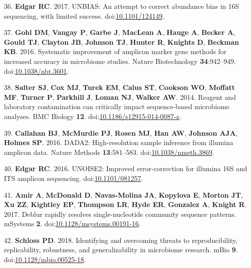 \documentclass[11pt,]{article}
\begin{document}
\hypertarget{ref-Edgar2017}{}
36. \textbf{Edgar RC}. 2017. UNBIAS: An attempt to correct abundance
bias in 16S sequencing, with limited success.
doi:\href{https://doi.org/10.1101/124149}{10.1101/124149}.

\hypertarget{ref-Gohl2016}{}
37. \textbf{Gohl DM}, \textbf{Vangay P}, \textbf{Garbe J},
\textbf{MacLean A}, \textbf{Hauge A}, \textbf{Becker A}, \textbf{Gould
TJ}, \textbf{Clayton JB}, \textbf{Johnson TJ}, \textbf{Hunter R},
\textbf{Knights D}, \textbf{Beckman KB}. 2016. Systematic improvement of
amplicon marker gene methods for increased accuracy in microbiome
studies. Nature Biotechnology \textbf{34}:942--949.
doi:\href{https://doi.org/10.1038/nbt.3601}{10.1038/nbt.3601}.

\hypertarget{ref-Salter2014}{}
38. \textbf{Salter SJ}, \textbf{Cox MJ}, \textbf{Turek EM},
\textbf{Calus ST}, \textbf{Cookson WO}, \textbf{Moffatt MF},
\textbf{Turner P}, \textbf{Parkhill J}, \textbf{Loman NJ},
\textbf{Walker AW}. 2014. Reagent and laboratory contamination can
critically impact sequence-based microbiome analyses. BMC Biology
\textbf{12}.
doi:\href{https://doi.org/10.1186/s12915-014-0087-z}{10.1186/s12915-014-0087-z}.

\hypertarget{ref-Callahan2016}{}
39. \textbf{Callahan BJ}, \textbf{McMurdie PJ}, \textbf{Rosen MJ},
\textbf{Han AW}, \textbf{Johnson AJA}, \textbf{Holmes SP}. 2016. DADA2:
High-resolution sample inference from illumina amplicon data. Nature
Methods \textbf{13}:581--583.
doi:\href{https://doi.org/10.1038/nmeth.3869}{10.1038/nmeth.3869}.

\hypertarget{ref-Edgar2016}{}
40. \textbf{Edgar RC}. 2016. UNOISE2: Improved error-correction for
illumina 16S and ITS amplicon sequencing.
doi:\href{https://doi.org/10.1101/081257}{10.1101/081257}.

\hypertarget{ref-Amir2017a}{}
41. \textbf{Amir A}, \textbf{McDonald D}, \textbf{Navas-Molina JA},
\textbf{Kopylova E}, \textbf{Morton JT}, \textbf{Xu ZZ},
\textbf{Kightley EP}, \textbf{Thompson LR}, \textbf{Hyde ER},
\textbf{Gonzalez A}, \textbf{Knight R}. 2017. Deblur rapidly resolves
single-nucleotide community sequence patterns. mSystems \textbf{2}.
doi:\href{https://doi.org/10.1128/msystems.00191-16}{10.1128/msystems.00191-16}.

\hypertarget{ref-Schloss2018}{}
42. \textbf{Schloss PD}. 2018. Identifying and overcoming threats to
reproducibility, replicability, robustness, and generalizability in
microbiome research. mBio \textbf{9}.
doi:\href{https://doi.org/10.1128/mbio.00525-18}{10.1128/mbio.00525-18}.
\end{document}

